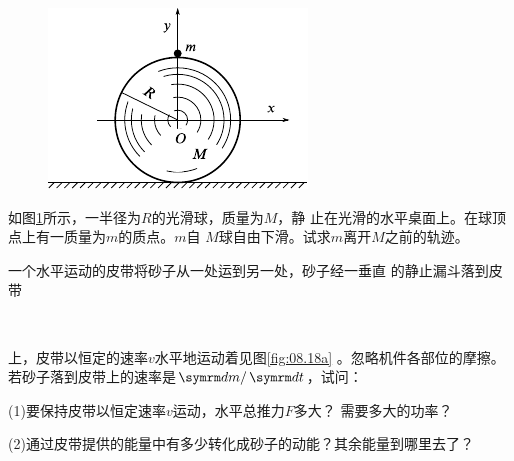 \begin{exercises}
\begin{figure}
  \centering
  \includegraphics{figure/fig08.17}
  \caption{}
  \label{fig:08.17}
\end{figure}
\exercise 如图\ref{fig:08.17}所示，一半径为$ R $的光滑球，质量为$ M $，静
止在光滑的水平桌面上。在球顶点上有一质量为$ m $的质点。$ m $自
$ M $球自由下滑。试求$ m $离开$ M $之前的轨迹。

\exercise 一个水平运动的皮带将砂子从一处运到另一处，砂子经一垂直
的静止漏斗落到皮带

\begin{figure}
  \vspace{-1em}
  \centering
   \\
  \caption{}
  \label{fig:08.18}
\end{figure}
\noindent 上，皮带以恒定的速率$ v $水平地运动着\lhbrak 见图\ref{fig:08.18a}
\rhbrak 。忽略机件各部位的摩擦。若砂子落到皮带上的速率是$ \dif m / \dif t $，试问：

(1)要保持皮带以恒定速率$ v $运动，水平总推力$ F $多大？
需要多大的功率？

(2)通过皮带提供的能量中有多少转化成砂子的动能？其余能量到哪里去了？


\end{exercises}
